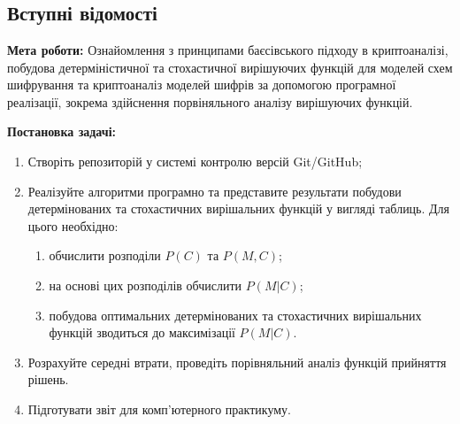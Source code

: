 \chapter{}
\section{Вступні відомості}
\noindent\textbf{Мета роботи:} Ознайомлення з принципами баєсівського підходу в криптоаналізі, побудова детерміністичної та стохастичної 
вирішуючих функцій для моделей схем шифрування та криптоаналіз моделей шифрів за допомогою програмної реалізації, зокрема здійснення 
порвіняльного аналізу вирішуючих функцій.

\noindent\textbf{Постановка задачі:}
\begin{enumerate}
    \item Створіть репозиторій у системі контролю версій Git/GitHub;
    \item Реалізуйте алгоритми програмно та представите результати побудови детермінованих та стохастичних вирішальних функцій у 
        вигляді таблиць. Для цього необхідно:
        \begin{enumerate}
            \item обчислити розподіли $P(C)$ та $P(M, C)$;
            \item на основі цих розподілів обчислити $P(M \vert C)$;
            \item побудова оптимальних детермінованих та стохастичних вирішальних функцій зводиться до максимізації $P(M \vert C)$.
        \end{enumerate}
    \item Розрахуйте середні втрати, проведіть порівняльний аналіз функцій прийняття рішень.
    \item Підготувати звіт для комп'ютерного практикуму.
\end{enumerate}
